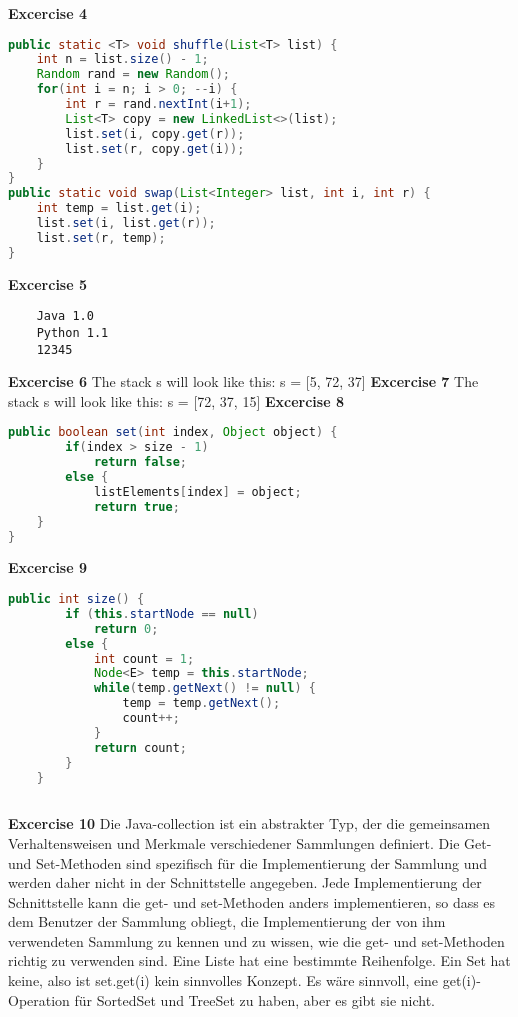 \documentclass{article}
\begin{document}
\textbf{Excercise 4}
\begin{lstlisting}[language=Java]
public static <T> void shuffle(List<T> list) {
    int n = list.size() - 1;
    Random rand = new Random();
    for(int i = n; i > 0; --i) {
        int r = rand.nextInt(i+1);
        List<T> copy = new LinkedList<>(list);
        list.set(i, copy.get(r));
        list.set(r, copy.get(i));
    }
}         
public static void swap(List<Integer> list, int i, int r) {
    int temp = list.get(i); 
    list.set(i, list.get(r)); 
    list.set(r, temp); 
}
\end{lstlisting}
\textbf{Excercise 5}
\begin{verbatim}
    Java 1.0
    Python 1.1
    12345
\end{verbatim}
\textbf{Excercise 6} \newline
The stack s will look like this: s = [5, 72, 37]\newline
\textbf{Excercise 7}\newline
The stack s will look like this: s = [72, 37, 15]\newline
\textbf{Excercise 8}
\begin{lstlisting}[language=Java]
    public boolean set(int index, Object object) {
        if(index > size - 1)
            return false;
        else {
            listElements[index] = object;
            return true;
    }
}

\end{lstlisting}
\textbf{Excercise 9}
\begin{lstlisting}[language=Java]
    public int size() {
		if (this.startNode == null)
			return 0;
		else {
			int count = 1;
			Node<E> temp = this.startNode;
			while(temp.getNext() != null) {
				temp = temp.getNext();
				count++;
			}
			return count;
		}
    }
	
\end{lstlisting}
\textbf{Excercise 10}\newline
Die Java-collection ist ein abstrakter Typ, der die gemeinsamen Verhaltensweisen und Merkmale verschiedener Sammlungen definiert. 
Die Get- und Set-Methoden sind spezifisch für die Implementierung der Sammlung und werden daher nicht in der Schnittstelle angegeben. 
Jede Implementierung der Schnittstelle kann die get- und set-Methoden anders implementieren, so dass es dem Benutzer der Sammlung obliegt, 
die Implementierung der von ihm verwendeten Sammlung zu kennen und zu wissen, wie die get- und set-Methoden richtig zu verwenden sind.
Eine Liste hat eine bestimmte Reihenfolge. Ein Set hat keine, also ist set.get(i) kein sinnvolles Konzept.
Es wäre sinnvoll, eine get(i)-Operation für SortedSet und TreeSet zu haben, aber es gibt sie nicht.
\end{document}
